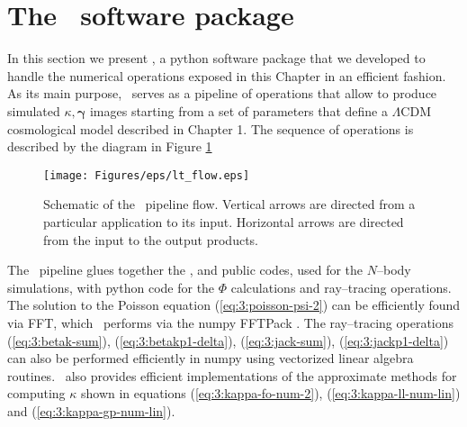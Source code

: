 
\section{The \LT\, software package}
\label{sec:3:lt}
In this section we present \LT \citep{lenstools}, a {\sc python} software package that we developed to handle the numerical operations exposed in this Chapter in an efficient fashion. As its main purpose, \LT\, serves as a pipeline of operations that allow to produce simulated $\kappa,\pmb{\gamma}$ images starting from a set of parameters that define a $\Lambda$CDM cosmological model described in Chapter 1. The sequence of operations is described by the diagram in Figure \ref{fig:3:lt-flow}  
%
\begin{figure}
\begin{center}
\texttt{[image: Figures/eps/lt\_flow.eps]}
\end{center}
\caption{Schematic of the \LT\, pipeline flow. Vertical arrows are directed from a particular application to its input. Horizontal arrows are directed from the input to the output products.}
\label{fig:3:lt-flow}
\end{figure}
%
The \LT\, pipeline glues together the ,  and  public codes, used for the $N$--body simulations, with {\sc python} code for the $\Phi$ calculations and ray--tracing operations. The solution to the Poisson equation (\ref{eq:3:poisson-psi-2}) can be efficiently found via FFT, which \LT\, performs via the {\sc numpy} FFTPack \citep{scipy}. The ray--tracing operations (\ref{eq:3:betak-sum}), (\ref{eq:3:betakp1-delta}), (\ref{eq:3:jack-sum}), (\ref{eq:3:jackp1-delta}) can also be performed efficiently in {\sc numpy} using vectorized linear algebra routines. \LT\, also provides efficient implementations of the approximate methods for computing $\kappa$ shown in equations (\ref{eq:3:kappa-fo-num-2}), (\ref{eq:3:kappa-ll-num-lin}) and (\ref{eq:3:kappa-gp-num-lin}). 

